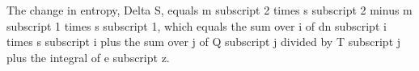 The change in entropy, Delta S, equals m subscript 2 times s subscript 2 minus m subscript 1 times s subscript 1, which equals the sum over i of dn subscript i times s subscript i plus the sum over j of Q subscript j divided by T subscript j plus the integral of e subscript z.
